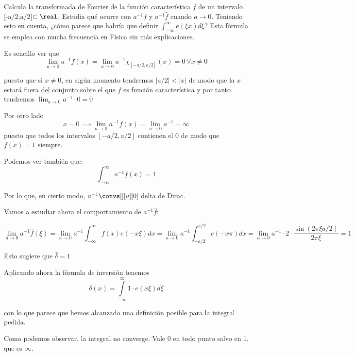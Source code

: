 \begin{problem}[4]
	Calcula la transformada de Fourier de la función característica $f$ de un intervalo [-a/2,a/2]$\subset \real$. Estudia qué ocurre con $a^{-1}f$ y $a^{-1}\hat{f}$ cuando $a \to 0$. Teniendo esto en cuenta, ¿cómo parece que habría que definir $\int_{-\infty}^{\infty}e(\xi x)d\xi $? Esta fórmula se emplea con mucha frecuencia en Física sin más explicaciones.

	\solution
	Es sencillo ver que
	\[\lim_{a \rightarrow 0} a^{-1} f(x) = \lim_{a \rightarrow 0} a^{-1} \chi_{[-a/2,a/2]} (x) = 0\ \forall x\neq 0\]

	puesto que si $x \neq 0$, en algún momento tendremos $|a/2| < |x|$ de modo que la $x$ estará fuera del conjunto sobre el que $f$ es función característica y por tanto tendremos $ \lim_{a \rightarrow 0} a^{-1} \cdot 0 = 0$

	Por otro lado
	\[x = 0 \implies \lim_{a \rightarrow 0} a^{-1} f(x) = \lim_{a \rightarrow 0} a^{-1} = \infty \]
	puesto que todos los intervalos $[-a/2,a/2]$ contienen el 0 de modo que $f(x)=1$ siempre.

	Podemos ver también que:
	$$\int^{\infty}_{-\infty} a^{-1} f(x) = 1 $$

	Por lo que, en cierto modo, $a^{-1} \convs[][a][0]$ delta de Dirac.

	Vamos a estudiar ahora el comportamiento de $a^{-1}\hat{f}$:

	$$\lim_{a \rightarrow 0} a^{-1} \hat{f}(\xi) = \lim_{a \rightarrow 0} a^{-1} \int^{\infty}_{-\infty} f(x) e(-x \xi) dx = \lim_{a \rightarrow 0} a^{-1} \int^{a/2}_{-a/2} e(-x\pi) dx = \lim_{a \rightarrow 0} a^{-1} \cdot 2 \cdot \frac{\sin (2 \pi \xi a/2)}{2 \pi \xi} =1 $$

	Esto sugiere que $\hat{\delta} = 1$

	Aplicando ahora la fórmula de inversión  tenemos
	\[\delta (x) = \int\limits^{\infty}_{-\infty} 1 \cdot e(x \xi) d \xi\]

	con lo que parece que hemos alcanzado una definición posible para la integral pedida.

	\obs Como podemos observar, la integral no converge. Vale $0$ en todo punto salvo en 1, que es $\infty$.

\end{problem}

